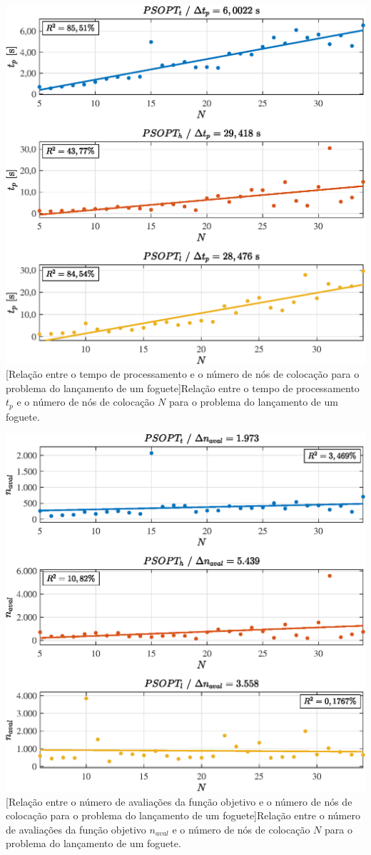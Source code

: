 \noindent
\begin{minipage}{\textwidth}
	\vspace{\onelineskip}
	\centering
	\includegraphics[width=0.7\linewidth]{fig/resultados/foguete/sens/t}
	[Relação entre o tempo de processamento e o número de nós de colocação para o problema do lançamento de um foguete]{Relação entre o tempo de processamento $ t_p $ e o número de nós de colocação $ N $ para o problema do lançamento de um foguete.}
	\vspace{\onelineskip}
\end{minipage}

\noindent
\begin{minipage}{\textwidth}
	\vspace{\onelineskip}
	\centering
	\includegraphics[width=0.7\linewidth]{fig/resultados/foguete/sens/eval}
	[Relação entre o número de avaliações da função objetivo e o número de nós de colocação para o problema do lançamento de um foguete]{Relação entre o número de avaliações da função objetivo $ n_{aval} $ e o número de nós de colocação $ N $ para o problema do lançamento de um foguete.}
	\label{fig:foguete:sensibilidade:naval}
	\vspace{\onelineskip}
\end{minipage}

